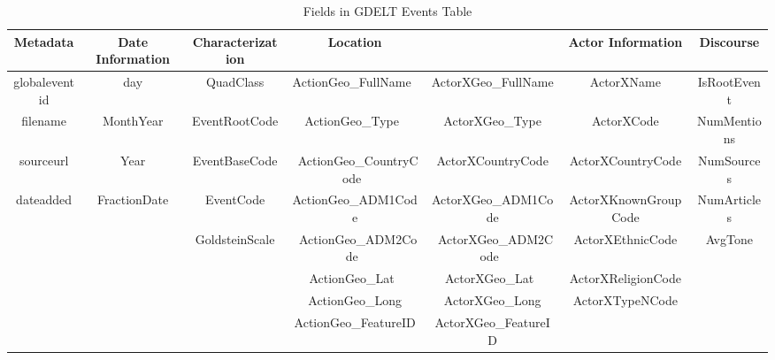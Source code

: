 \begin{table}[H]
\begin{center}
\caption{Fields in GDELT Events Table} 
\label{table:GDELTEventFields}
\begin{adjustbox}{max width=1.1\textwidth,center}
\begin{tabular}{| c | c | c | c | c | c | c |}
\hline
\textbf{Metadata} & \textbf{Date Information} & \textbf{Characterization} & \textbf{Location} &  & \textbf{Actor Information} & \textbf{Discourse} \\
\hline
globaleventid & day & QuadClass & ActionGeo\_FullName  & ActorXGeo\_FullName  & ActorXName & IsRootEvent \\
\hline
filename & MonthYear & EventRootCode & ActionGeo\_Type  & ActorXGeo\_Type & ActorXCode & NumMentions \\
\hline
sourceurl & Year & EventBaseCode &  ActionGeo\_CountryCode  & ActorXCountryCode & ActorXCountryCode & NumSources \\
\hline
dateadded & FractionDate & EventCode & ActionGeo\_ADM1Code & ActorXGeo\_ADM1Code & ActorXKnownGroupCode & NumArticles \\
\hline
 &  & GoldsteinScale &  ActionGeo\_ADM2Code  &  ActorXGeo\_ADM2Code  & ActorXEthnicCode &  AvgTone \\
\hline
 &  &  & ActionGeo\_Lat  & ActorXGeo\_Lat  & ActorXReligionCode &  \\
\hline
 &  &  & ActionGeo\_Long & ActorXGeo\_Long & ActorXTypeNCode &  \\
\hline
 &  &  & ActionGeo\_FeatureID & ActorXGeo\_FeatureID &  &  \\
\hline
\end{tabular}
\end{adjustbox}
\end{center}
\end{table}  

